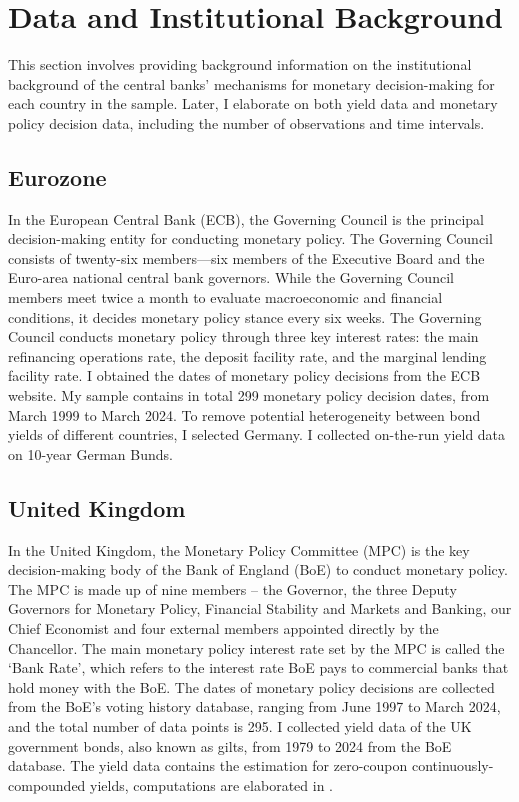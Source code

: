 \section{Data and Institutional Background}

This section involves providing background information on the institutional background of the central banks' mechanisms for monetary decision-making for each country in the sample. Later, I elaborate on both yield data and monetary policy decision data, including the number of observations and time intervals.

\subsection{Eurozone}

In the European Central Bank (ECB), the Governing Council is the principal decision-making entity for conducting monetary policy. The Governing Council consists of twenty-six members---six members of the Executive Board and the Euro-area national central bank governors. While the Governing Council members meet twice a month to evaluate macroeconomic and financial conditions, it decides monetary policy stance every six weeks. The Governing Council conducts monetary policy through three key interest rates: the main refinancing operations rate, the deposit facility rate, and the marginal lending facility rate. I obtained the dates of monetary policy decisions from the ECB website. My sample contains in total 299 monetary policy decision dates, from March 1999 to March 2024. To remove potential heterogeneity between bond yields of different countries, I selected Germany. I collected on-the-run yield data on 10-year German Bunds.

\subsection{United Kingdom}

In the United Kingdom, the Monetary Policy Committee (MPC) is the key decision-making body of the Bank of England (BoE) to conduct monetary policy. The MPC is made up of nine members – the Governor, the three Deputy Governors for Monetary Policy, Financial Stability and Markets and Banking, our Chief Economist and four external members appointed directly by the Chancellor. The main monetary policy interest rate set by the MPC is called the `Bank Rate', which refers to the interest rate BoE pays to commercial banks that hold money with the BoE. The dates of monetary policy decisions are collected from the BoE's voting history database, ranging from June 1997 to March 2024, and the total number of data points is 295. I collected yield data of the UK government bonds, also known as gilts, from 1979 to 2024 from the BoE database. The yield data contains the estimation for zero-coupon continuously-compounded yields, computations are elaborated in \citet{anderson2001new}.

